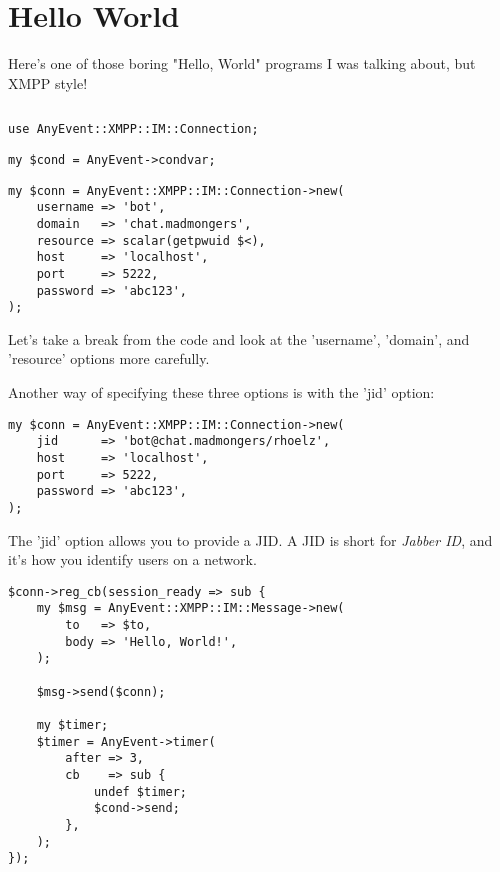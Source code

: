 \section*{Hello World}

Here's one of those boring "Hello, World" programs I was talking about, but XMPP style!

\begin{shaded}
\inputminted{perl}{examples/hello.pl}
\end{shaded}
\pause

\begin{shaded}
\begin{verbatim}
use AnyEvent::XMPP::IM::Connection;
\end{verbatim}
\end{shaded}

\pause
\begin{shaded}
\begin{verbatim}
my $cond = AnyEvent->condvar;
\end{verbatim}
\end{shaded}

\newpage
\begin{shaded}
\begin{verbatim}
my $conn = AnyEvent::XMPP::IM::Connection->new(
    username => 'bot',
    domain   => 'chat.madmongers',
    resource => scalar(getpwuid $<),
    host     => 'localhost',
    port     => 5222,
    password => 'abc123',
);
\end{verbatim}
\end{shaded}

\pause
Let's take a break from the code and look at the 'username', 'domain', and
'resource' options more carefully.

\pause
Another way of specifying these three options is with the 'jid' option:

\begin{shaded}
\begin{verbatim}
my $conn = AnyEvent::XMPP::IM::Connection->new(
    jid      => 'bot@chat.madmongers/rhoelz',
    host     => 'localhost',
    port     => 5222,
    password => 'abc123',
);
\end{verbatim}
\end{shaded}

\pause
The 'jid' option allows you to provide a JID.  A JID is short for \textit{Jabber ID}, and it's how
you identify users on a network.

\pause
\begin{shaded}
\begin{verbatim}
$conn->reg_cb(session_ready => sub {
    my $msg = AnyEvent::XMPP::IM::Message->new(
        to   => $to,
        body => 'Hello, World!',
    );

    $msg->send($conn);

    my $timer;
    $timer = AnyEvent->timer(
        after => 3,
        cb    => sub {
            undef $timer;
            $cond->send;
        },
    );
});
\end{verbatim}
\end{shaded}

